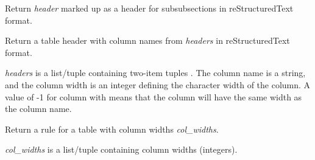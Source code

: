\documentclass[letterpaper,10pt,english]{sphinxmanual}
\begin{document}
\begin{fulllineitems}
\begin{fulllineitems}
\end{fulllineitems}


\begin{fulllineitems}
\label{setlyze/std:setlyze.std.ExportTextReport.subsubsection}
Return \emph{header} marked up as a header for subsubsections in
reStructuredText format.

\end{fulllineitems}


\begin{fulllineitems}
\label{setlyze/std:setlyze.std.ExportTextReport.table}
Return a table header with column names from \emph{headers} in
reStructuredText format.

\emph{headers} is a list/tuple containing two-item tuples
. The column name is a string,
and the column width is an integer defining the character width
of the column. A value of -1 for column with means that the
column will have the same width as the column name.

\end{fulllineitems}


\begin{fulllineitems}
\label{setlyze/std:setlyze.std.ExportTextReport.table_rule}
Return a rule for a table with column widths \emph{col\_widths}.

\emph{col\_widths} is a list/tuple containing column widths (integers).

\end{fulllineitems}


\end{fulllineitems}

\end{document}
